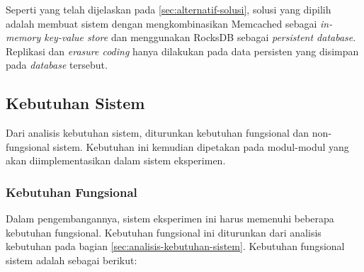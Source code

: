 Seperti yang telah dijelaskan pada \ref{sec:alternatif-solusi}, solusi yang dipilih adalah membuat sistem dengan mengkombinasikan Memcached sebagai \textit{in-memory key-value store} dan menggunakan RocksDB sebagai \textit{persistent database}. Replikasi dan \textit{erasure coding} hanya dilakukan pada data persisten yang disimpan pada \textit{database} tersebut.

\subsection{Kebutuhan Sistem}
\label{subsection:system-requirements}

Dari analisis kebutuhan sistem, diturunkan kebutuhan fungsional dan non-fungsional sistem. Kebutuhan ini kemudian dipetakan pada modul-modul yang akan diimplementasikan dalam sistem eksperimen.

\subsubsection{Kebutuhan Fungsional}
\label{subsection:functional-requirements}

Dalam pengembangannya, sistem eksperimen ini harus memenuhi beberapa kebutuhan fungsional. Kebutuhan fungsional ini diturunkan dari analisis kebutuhan pada bagian \ref{sec:analisis-kebutuhan-sistem}. Kebutuhan fungsional sistem adalah sebagai berikut:

